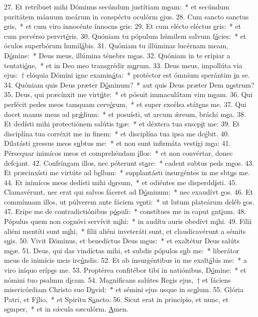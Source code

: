 27. Et retríbuet mihi Dóminus secúndum justítiam m\uline{e}am:~* et secúndum puritátem mánuum meárum in conspéctu oculórm \uline{e}jus.
28. Cum sancto sanctus \uline{e}ris,~* et cum viro innocénte ínnocns \uline{e}ris:
29. Et cum elécto eléctus \uline{e}ris:~* et cum pervérso pervrt\uline{é}ris.
30. Quóniam tu pópulum húmilem salvum f\uline{á}cies:~* et óculos superbórum humil\uline{á}bis.
31. Quóniam tu illúminas lucérnam meam, D\uline{ó}mine:~* Deus meus, illúmina ténebrs m\uline{e}as.
32. Quóniam in te erípiar a tentati\uline{ó}ne,~* et in Deo meo transgrédir m\uline{u}rum.
33. Deus meus, impollúta via ejus:~† elóquia Dómini igne examin\uline{á}ta:~* protéctor est ómnium sperántim \uline{i}n se.
34. Quóniam quis Deus præter D\uline{ó}minum?~* aut quis Deus præter Dem n\uline{o}strum?
35. Deus, qui præcínxit me virt\uline{ú}te:~* et pósuit immaculátam vim m\uline{e}am.
36. Qui perfécit pedes meos tamquam cerv\uline{ó}rum,~* et super excélsa stát\uline{e}ns me.
37. Qui docet manus meas ad pr\uline{ǽ}lium:~* et posuísti, ut arcum ǽreum, bráchi m\uline{e}a.
38. Et dedísti mihi protectiónem salútis t\uline{u}æ:~* et déxtera tua suscp\uline{i}t me:
39. Et disciplína tua corréxit me in f\uline{i}nem:~* et disciplína tua ipsa me dc\uline{é}bit.
40. Dilatásti gressus meos s\uline{u}btus me:~* et non sunt infirmáta vestígi m\uline{e}a:
41. Pérsequar inimícos meos et comprehéndam \uline{i}llos:~* et non convértar, donec defc\uline{i}ant.
42. Confríngam illos, nec póterunt st\uline{a}re:~* cadent subtus peds m\uline{e}os.
43. Et præcinxísti me virtúte ad b\uline{e}llum:~* supplantásti insurgéntes in me sbt\uline{u}s me.
44. Et inimícos meos dedísti mihi d\uline{o}rsum,~* et odiéntes me disperdd\uline{í}sti.
45. Clamavérunt, nec erat qui salvos fáceret ad D\uline{ó}minum:~* nec exaudívt \uline{e}os.
46. Et commínuam illos, ut púlverem ante fáciem v\uline{e}nti:~* ut lutum plateárum deléb \uline{e}os.
47. Eripe me de contradictiónibus p\uline{ó}puli:~* constítues me in caput gnt\uline{i}um.
48. Pópulus quem non cognóvi servívit m\uline{i}hi:~* in audítu auris obedívt m\uline{i}hi.
49. Fílii aliéni mentíti sunt m\uline{i}hi,~* fílii aliéni inveteráti sunt, et claudicavérunt a sémits s\uline{u}is.
50. Vivit Dóminus, et benedíctus Deus m\uline{e}us:~* et exaltétur Deus salúts m\uline{e}æ.
51. Deus, qui das vindíctas mihi, et subdis pópulos s\uline{u}b me:~* liberátor meus de inimícis meis irc\uline{ú}ndis.
52. Et ab insurgéntibus in me exalt\uline{á}bis me:~* a viro iníquo eríp\uline{e}s me.
53. Proptérea confitébor tibi in natiónibus, D\uline{ó}mine:~* et nómini tuo psalmm d\uline{i}cam.
54. Magníficans salútes Regis ejus,~† et fáciens misericórdiam Christo suo D\uline{a}vid:~* et sémini ejus usque in sc\uline{u}lum.
55. Glória Patri, et F\uline{í}lio,~* et Spirítu S\uline{a}ncto.
56. Sicut erat in princípio, et nunc, et s\uline{e}mper,~* et in sǽcula sæculórm. \uline{A}men.
